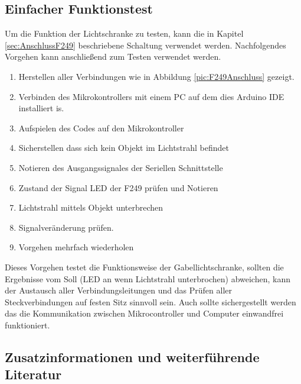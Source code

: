 \subsection{Einfacher Funktionstest}
Um die Funktion der Lichtschranke zu testen, kann die in Kapitel \ref{sec:AnschlussF249} beschriebene Schaltung verwendet werden. 
Nachfolgendes Vorgehen kann anschließend zum Testen verwendet werden.  
\begin{center}
	\begin{enumerate}
		\item Herstellen aller Verbindungen wie in Abbildung  \ref{pic:F249Anschluss} gezeigt. 
		\item Verbinden des Mikrokontrollers mit einem PC auf dem dies Arduino IDE installiert is. 
		\item Aufspielen des Codes auf den Mikrokontroller 
		\item Sicherstellen dass sich kein Objekt im Lichtstrahl befindet
		\item Notieren des Ausgangssignales der Seriellen Schnittstelle 
		\item  Zustand der Signal LED der F249 prüfen und Notieren
		\item Lichtstrahl mittels Objekt unterbrechen 
		\item Signalveränderung prüfen.  
		\item Vorgehen mehrfach wiederholen 
	\end{enumerate}
\end{center}
Dieses Vorgehen testet die Funktionsweise der Gabellichtschranke, sollten die Ergebnisse vom Soll (LED an wenn Lichtstrahl unterbrochen) abweichen, kann der Austausch aller Verbindungsleitungen und das Prüfen aller Steckverbindungen auf festen Sitz sinnvoll sein. Auch sollte sichergestellt werden das die Kommunikation zwischen Mikrocontroller und Computer einwandfrei funktioniert. 

%
\subsection{Zusatzinformationen und weiterführende Literatur }


